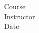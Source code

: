 \documentclass[12pt]{article}
\theoremstyle{plain}
\theoremstyle{definition}
\theoremstyle{remark}
\begin{document}
	
	{\large
	
		\begin{center}

			Course \\
			Instructor \\
			Date

		\end{center}

	}



\end{document}
